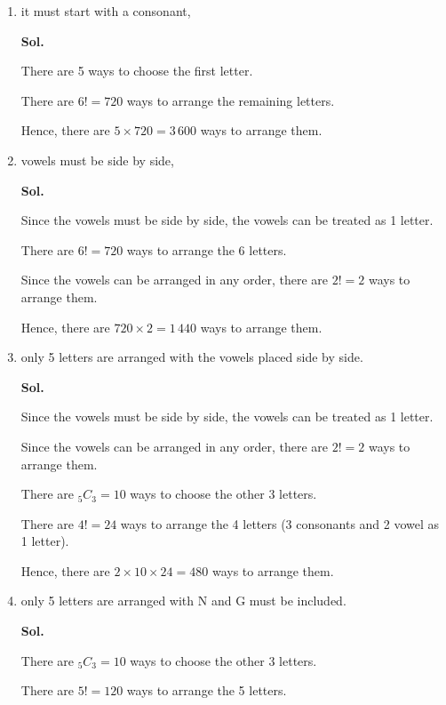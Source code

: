 \documentclass{report}
\newcommand\comb[2][^n]{{}_{#1}C_{#2}}
\newcommand{\sol}[1]{

      \noindent \textbf{Sol.}
}
\def\eos{\quad\hbox{\rlap{\hbox{\vrule depth 1.5pt height 2.6mm width 0.2mm \hskip 1mm \vrule height 2.6mm width 0.2mm}}{\vbox{\hrule height 0.2mm width 1.4mm \vskip 2.8mm \hrule depth 1.5pt height -0.35mm width 1.2mm}}}}
\begin{document}
\begin{multicols*}{2}
\begin{enumerate}
\begin{enumerate}
                        \item it must start with a consonant, \sol{}

                              There are 5 ways to choose the first letter.

                              There are $6! = 720$ ways to arrange the remaining letters.

                              Hence, there are $5 \times 720 = 3\,600$ ways to arrange them. $\eos$

                        \item vowels must be side by side, \sol{}

                              Since the vowels must be side by side, the vowels can be treated as 1 letter.

                              There are $6! = 720$ ways to arrange the 6 letters.

                              Since the vowels can be arranged in any order, there are $2! = 2$ ways to
                              arrange them.

                              Hence, there are $720 \times 2 = 1\,440$ ways to arrange them. $\eos$

                        \item only 5 letters are arranged with the vowels placed side by side. \sol{}

                              Since the vowels must be side by side, the vowels can be treated as 1 letter.

                              Since the vowels can be arranged in any order, there are $2! = 2$ ways to
                              arrange them.

                              There are $\comb[5]{3} = 10$ ways to choose the other 3 letters.

                              There are $4! = 24$ ways to arrange the 4 letters (3 consonants and 2 vowel as
                              1 letter).

                              Hence, there are $2 \times 10 \times 24 = 480$ ways to arrange them. $\eos$

                        \item only 5 letters are arranged with N and G must be included. \sol{}

                              There are $\comb[5]{3} = 10$ ways to choose the other 3 letters.

                              There are $5! = 120$ ways to arrange the 5 letters.


\end{enumerate}
\end{enumerate}
\end{multicols*}
\end{document}
